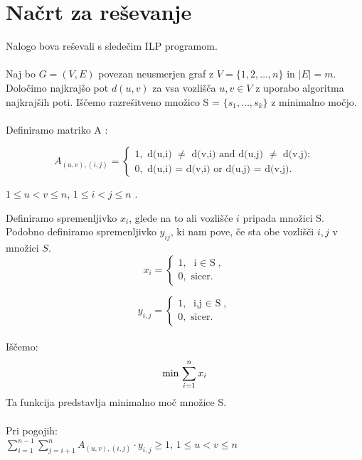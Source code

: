 \documentclass[a4paper]{report}
\begin{document}
\section{Načrt za reševanje}
Nalogo bova reševali s sledečim ILP programom.\\\\
Naj bo $G = ( V, E )$ povezan neusmerjen graf z $V = \{ 1,2, \dots, n \} $ in  $\mid E\mid=m$. Določimo najkrajšo pot $d(u,v)$  za vsa vozlišča $u,v \in V $ z uporabo algoritma najkrajših poti. Iščemo razrešitveno množico S = $\{s_1, \dots, s_k \}$ z minimalno močjo. \\\\
Definiramo matriko A :\\
\begin{center}
\[ A_{(u,v),(i,j)}  =  \left \{ \begin{array}{l}
1,  \mbox{ d(u,i) $\neq$ d(v,i) and d(u,j) $\neq$ d(v,j)}; \\
0, \mbox{ d(u,i) = d(v,i) or d(u,j) = d(v,j)}. \end{array} \right. 
\]

 $1 \le u < v \le n$, $1 \le i < j \le n $ .  \\ 
\end{center}
\pagebreak
Definiramo spremenljivko $x_i$, glede na to ali vozlišče $i$ pripada množici S. Podobno definiramo spremenljivko $y_{ij}$, ki nam pove, če sta obe vozlišči $i,j$ v množici $S$.\\

\[  x_i = \left \{ \begin{array}{l}
1, \mbox{ i $\in$ S}, \\
0, \mbox{ sicer}. \end{array} \right
.\] 

\[  y_{i,j} = \left \{ \begin{array}{l}
1, \mbox{ i,j $\in$ S}, \\
0, \mbox{ sicer}. \end{array} \right
.\]\\
Iščemo: 
\begin{displaymath}
\text{min } {\large  \sum_{i=1}^{n} x_i }
\end{displaymath} 
Ta funkcija predstavlja minimalno moč množice S. \\ 
\\
Pri pogojih:\\


$\displaystyle \sum_{i=1}^{n-1}\sum_{j=i+1}^{n} A_{(u,v),(i,j)} \cdot y_{i,j}\ge 1 $,      $1\le u < v\le n$ \\
\end{document}
